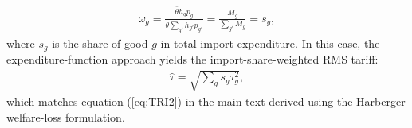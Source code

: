\documentclass[12pt,pdftex]{article}
\begin{document}
\begin{onehalfspacing}
\begin{align}
\omega_g = \frac{\bar{\theta} h_g p_g}{\bar{\theta} \sum_{g'} h_{g'} p_{g'}} = \frac{M_g}{\sum_{g'} M_{g}} = s_g,
\end{align}
where $s_g$ is the share of good $g$ in total import expenditure. In this case, the expenditure-function approach yields the import-share-weighted RMS tariff:
\begin{align}
\hat{\tau}
= \sqrt{\sum_g s_g \tau_g^2},
\end{align}
which matches equation (\ref{eq:TRI2}) in the main text derived using the Harberger welfare-loss formulation.
\end{onehalfspacing}
\end{document}
